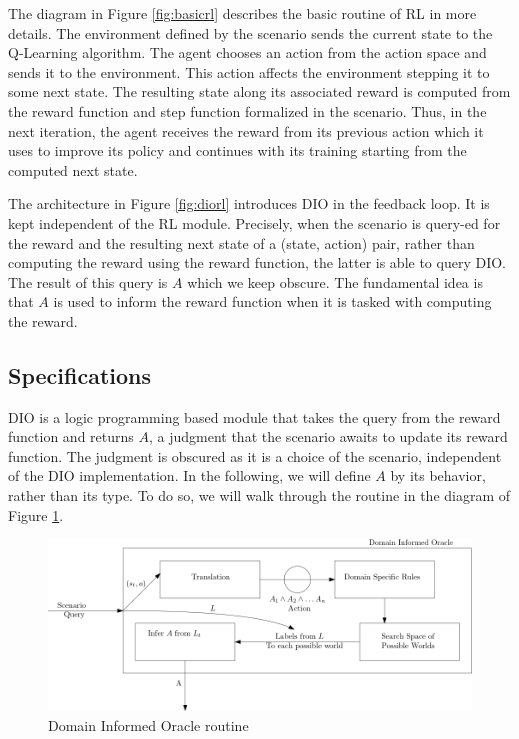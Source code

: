 The diagram in Figure \ref{fig:basicrl} describes the basic routine of RL in more details. The environment defined by the scenario sends the current state 
to the Q-Learning algorithm. The agent chooses an action from the action space and sends it to the environment. This action affects the environment stepping it to some next state. 
The resulting state along its associated reward is computed from the reward function and step function formalized in the scenario. Thus, in the next iteration, the 
agent receives the reward from its previous action which it uses to improve its policy and continues with its training starting from the computed next state.  

\medskip 

The architecture in Figure \ref{fig:diorl} introduces DIO in the feedback loop. It is kept independent of the RL module. Precisely, when the scenario is query-ed for the reward and 
the resulting next state of a (state, action) pair, rather than computing the reward using the reward function, the latter is able to query DIO. The result of this query is $A$ which we keep 
obscure. The fundamental idea is that $A$ is used to inform the reward function when it is tasked with computing the reward. 

\subsection{Specifications} \label{scspecs}
DIO is a logic programming based module that takes the query from the reward function and returns $A$, a judgment that the scenario awaits to update its reward function. The judgment is obscured as it is a choice of the scenario, 
independent of the DIO implementation. In the following, we will define $A$ by its behavior, rather than its type. To do so, we will walk through the routine in the diagram of Figure \ref{fig:diospecs}.


\begin{figure}[H]
  \centering
  \includegraphics[scale=0.46]{figures/diospecs.png}
  \caption{Domain Informed Oracle routine}
  \label{fig:diospecs}
\end{figure}

